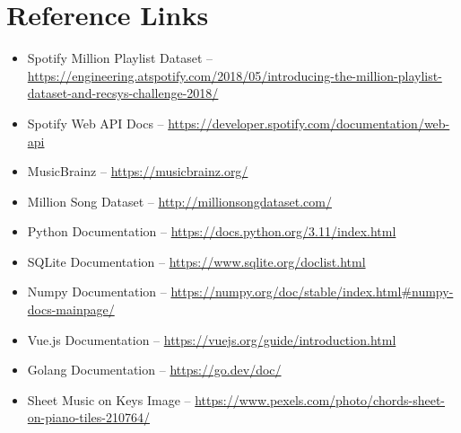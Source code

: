 \documentclass[a4paper, 12pt]{report}
\begin{document}
\chapter*{Reference Links}
\normalsize{
\begin{itemize}
    \item Spotify Million Playlist Dataset -- \url{https://engineering.atspotify.com/2018/05/introducing-the-million-playlist-dataset-and-recsys-challenge-2018/}
    \item Spotify Web API Docs -- \url{https://developer.spotify.com/documentation/web-api}
    \\
    \item MusicBrainz -- \url{https://musicbrainz.org/}
    \item Million Song Dataset -- \url{http://millionsongdataset.com/}
    \\
    \item Python Documentation -- \url{https://docs.python.org/3.11/index.html}
    \item SQLite Documentation -- \url{https://www.sqlite.org/doclist.html}
    \item Numpy Documentation -- \url{https://numpy.org/doc/stable/index.html#numpy-docs-mainpage/}
    \item Vue.js Documentation -- \url{https://vuejs.org/guide/introduction.html}
    \item Golang Documentation -- \url{https://go.dev/doc/}
    \\
    \item Sheet Music on Keys Image -- \url{https://www.pexels.com/photo/chords-sheet-on-piano-tiles-210764/}
\end{itemize}
}
\end{document}
